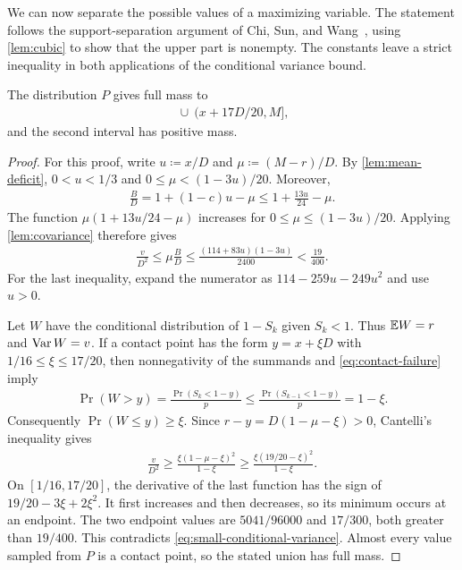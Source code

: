 We can now separate the possible values of a maximizing variable.
The statement follows the support-separation argument of Chi, Sun, and Wang~\cite[Proposition 5.1]{CSW2026}, using \cref{lem:cubic} to show that the upper part is nonempty. The constants leave a strict inequality in both applications of the conditional variance bound.

\begin{lemma}\label{lem:support-gap}
The distribution $P$ gives full mass to
\begin{align*}
 [0,x+D/16]\ \cup\ (x+17D/20,M],
\end{align*}
and the second interval has positive mass.
\end{lemma}

\begin{proof}
For this proof, write $u\coloneqq x/D$ and $\mu\coloneqq(M-r)/D$.
By \cref{lem:mean-deficit}, $0<u<1/3$ and $0\le\mu<(1-3u)/20$.
Moreover,
\begin{align*}
 \frac BD=1+(1-c)u-\mu\le1+\frac{13u}{24}-\mu.
\end{align*}
The function $\mu(1+13u/24-\mu)$ increases for $0\le\mu\le(1-3u)/20$.
Applying \cref{lem:covariance} therefore gives
\begin{align}
 \frac v{D^2}
 \le\mu\frac BD
 \le\frac{(114+83u)(1-3u)}{2400}
 <\frac{19}{400}.
 \label{eq:small-conditional-variance}
\end{align}
For the last inequality, expand the numerator as $114-259u-249u^2$ and use $u>0$.

Let $W$ have the conditional distribution of $1-S_k$ given $S_k<1$.
Thus $\mathbb E W=r$ and $\operatorname{Var} W=v$.
If a contact point has the form $y=x+\xi D$ with $1/16\le\xi\le17/20$, then nonnegativity of the summands and \cref{eq:contact-failure} imply
\begin{align*}
 \Pr(W>y)
 =\frac{\Pr(S_k<1-y)}p
 \le\frac{\Pr(S_{k-1}<1-y)}p
 =1-\xi.
\end{align*}
Consequently $\Pr(W\le y)\ge\xi$.
Since $r-y=D(1-\mu-\xi)>0$, Cantelli's inequality gives
\begin{align*}
 \frac v{D^2}
 \ge\frac{\xi(1-\mu-\xi)^2}{1-\xi}
 \ge\frac{\xi(19/20-\xi)^2}{1-\xi}.
\end{align*}
On $[1/16,17/20]$, the derivative of the last function has the sign of $19/20-3\xi+2\xi^2$.
It first increases and then decreases, so its minimum occurs at an endpoint.
The two endpoint values are $5041/96000$ and $17/300$, both greater than $19/400$.
This contradicts \cref{eq:small-conditional-variance}.
Almost every value sampled from $P$ is a contact point, so the stated union has full mass.


\end{proof}
